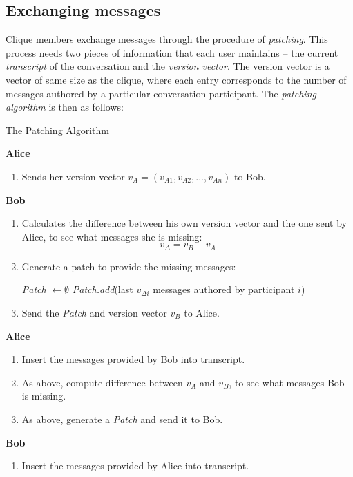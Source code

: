 \documentclass[a4paper, 12pt]{report}
\begin{document}
\subsection{Exchanging messages}
\label{subsec:prep.patching}
Clique members exchange messages through the procedure of \emph{patching}. This process needs two pieces of information that each user maintains -- the current \emph{transcript} of the conversation and the \emph{version vector}. The version vector is a vector of same size as the clique, where each entry corresponds to the number of messages authored by a particular conversation participant. The \emph{patching algorithm} is then as follows: \\ 
\begin{algorithm}
\caption{The Patching Algorithm}
\label{alg:patching}
{\bfseries Alice}
\begin{enumerate}
    \item Sends her version vector $v_A = (v_{A1}, v_{A2}, ..., v_{An})$ to Bob. \\
\end{enumerate}

{\bfseries Bob}
\begin{enumerate}
    \item Calculates the difference between his own version vector and the one sent by Alice, to see what messages she is missing:
        \begin{equation*}
            v_{\Delta} = v_B - v_A
        \end{equation*}
    \item {Generate a patch to provide the missing messages: \newline \vspace{-5mm}}
        \begin{algorithmic}
            \STATE \textit{Patch} $\leftarrow \emptyset$
                    \STATE \textit{Patch.add}(last $v_{\Delta i}$ messages authored by participant $i$)                        
                \ENDIF
            \ENDFOR
        \end{algorithmic}
    \item Send the \textit{Patch} and version vector $v_B$ to Alice. \\
\end{enumerate}

{\bfseries Alice}
\begin{enumerate}
    \item Insert the messages provided by Bob into transcript.
    \item As above, compute difference between $v_A$ and $v_B$, to see what messages Bob is missing.
    \item As above, generate a \textit{Patch} and send it to Bob. \\
\end{enumerate}

{\bfseries Bob}
\begin{enumerate}
    \item Insert the messages provided by Alice into transcript.
\end{enumerate}
\end{algorithm}
\end{document}
